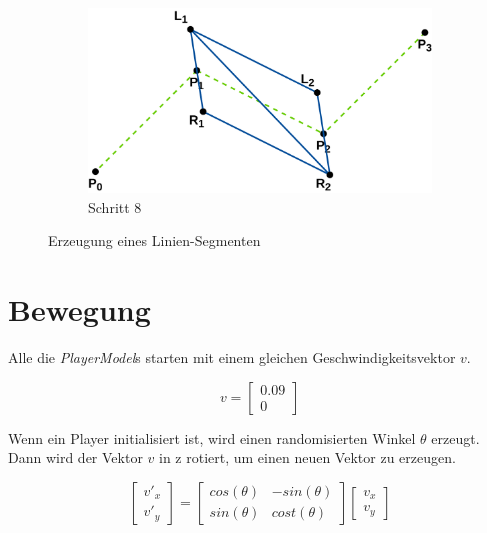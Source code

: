 \documentclass[doktyp=studarbeit]{TUBAFarbeiten}
\begin{document}
\begin{figure}[!htb]
\begin{subfigure}[b]{0.45\textwidth}
        \includegraphics[width=1\linewidth]{Schlangenlinie-8.png}
        \caption{Schritt 8}
    \end{subfigure}
    \caption{Erzeugung eines Linien-Segmenten}
	\label{fig:line}
\end{figure}

\section{Bewegung}

Alle die \textit{PlayerModel}s starten mit einem gleichen 
Geschwindigkeitsvektor $v$.

\begin{equation}
    v =
    \begin{bmatrix}
        0.09    \\
        0
    \end{bmatrix}
\end{equation}

Wenn ein Player initialisiert ist, wird einen randomisierten Winkel $\theta$ 
erzeugt. Dann wird der Vektor $v$ in z rotiert, um einen neuen Vektor zu 
erzeugen.

\begin{equation}
    \begin{bmatrix}
        v'_{x} \\
        v'_{y}     
    \end{bmatrix}
    =
    \begin{bmatrix}
        cos(\theta) & -sin(\theta) \\
        sin(\theta) & cost(\theta)
    \end{bmatrix}
    \begin{bmatrix}
        v_{x} \\
        v_{y}
    \end{bmatrix}
    \label{eq:rotation}
\end{equation}
\end{document}
